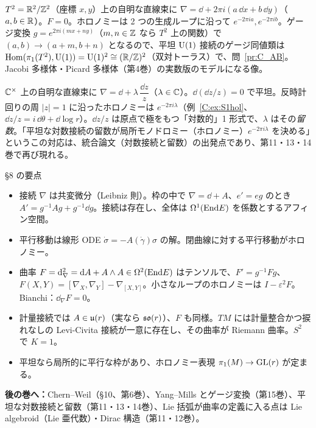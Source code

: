 \begin{ex}[トーラス上の平坦 $\U(1)$ 接続]\label{C:ex:torus}
$T^2=\mathbb R^2/\mathbb Z^2$（座標 $x,y$）上の自明な直線束に $\nabla=\dd+2\pi i(a\,\dd x+b\,\dd y)$（$a,b\in\mathbb R$）。$F=0$。ホロノミーは 2 つの生成ループに沿って $e^{-2\pi ia},e^{-2\pi ib}$。ゲージ変換 $g=e^{2\pi i(mx+ny)}$（$m,n\in\mathbb Z$ なら $T^2$ 上の関数）で $(a,b)\to(a+m,b+n)$ となるので、平坦 $\U(1)$ 接続のゲージ同値類は $\mathrm{Hom}(\pi_1(T^2),\mathrm{U}(1))=\mathrm{U}(1)^2\cong(\mathbb R/\mathbb Z)^2$（双対トーラス）で、問~\ref{pr:C_AB}。Jacobi 多様体・Picard 多様体（第4巻）の実数版のモデルになる像。
\end{ex}

\begin{ex}[対数接続の入り口]\label{C:ex:log}
$\mathbb C^\times$ 上の自明な直線束に $\nabla=\dd+\lambda\,\dfrac{\dd z}{z}$（$\lambda\in\mathbb C$）。$\dd(\dd z/z)=0$ で平坦。反時計回りの周 $|z|=1$ に沿ったホロノミーは $e^{-2\pi i\lambda}$（例~\ref{C:ex:S1hol}、$\dd z/z=i\,\dd\theta+\dd\log r$）。$\dd z/z$ は原点で極をもつ「対数的」1 形式で、$\lambda$ はその\emph{留数}。「平坦な対数接続の留数が局所モノドロミー（ホロノミー）$e^{-2\pi i\lambda}$ を決める」というこの対応は、統合論文（対数接続と留数）の出発点であり、第11・13・14巻で再び現れる。
\end{ex}

\begin{keybox}{§8 の要点}
\begin{itemize}
\item 接続 $\nabla$ は共変微分（Leibniz 則）。枠の中で $\nabla=\dd+A$、$e'=eg$ のとき $A'=g^{-1}Ag+g^{-1}\dd g$。接続は存在し、全体は $\Omega^1(\mathrm{End} E)$ を係数とするアフィン空間。
\item 平行移動は線形 ODE $\dot\sigma=-A(\dot\gamma)\sigma$ の解。閉曲線に対する平行移動がホロノミー。
\item 曲率 $F=\mathrm{d}_\nabla^2=\mathrm{d} A+A\wedge A\in\Omega^2(\mathrm{End} E)$ はテンソルで、$F'=g^{-1}Fg$、$F(X,Y)=[\nabla_X,\nabla_Y]-\nabla_{[X,Y]}$。小さなループのホロノミーは $I-\varepsilon^2F$。Bianchi：$\dd_\nabla F=0$。
\item 計量接続では $A\in\mathfrak{u}(r)$（実なら $\mathfrak{so}(r)$）、$F$ も同様。$TM$ には計量整合かつ捩れなしの Levi-Civita 接続が一意に存在し、その曲率が Riemann 曲率。$S^2$ で $K=1$。
\item 平坦なら局所的に平行な枠があり、ホロノミー表現 $\pi_1(M)\to\mathrm{GL}(r)$ が定まる。
\end{itemize}
\textbf{後の巻へ：}Chern--Weil（§10、第6巻）、Yang--Mills とゲージ変換（第15巻）、平坦な対数接続と留数（第11・13・14巻）、Lie 括弧が曲率の定義に入る点は Lie algebroid（Lie 亜代数）・Dirac 構造（第11・12巻）。
\end{keybox}

